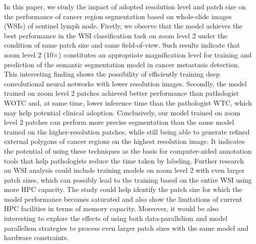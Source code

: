 In this paper, we study the impact of adopted resolution level and patch size on the performance of cancer region segmentation based on whole-slide images (WSIs) of sentinel lymph node. Firstly, we observe that the model achieves the best performance in the WSI classification task on zoom level 2 under the condition of same patch size and same field-of-view. Such results indicate that zoom level 2 (10$\times$) constitutes an appropriate magnification level for training and prediction of the semantic segmentation model in cancer metastasis detection. This interesting finding shows the possibility of efficiently training deep convolutional neural networks with lower resolution images. Secondly, the model trained on zoom level 2 patches achieved better performance than pathologist WOTC and, at same time, lower inference time than the pathologist WTC, which may help potential clinical adoption. Conclusively, our model trained on zoom level 2 patches can perform more precise segmentation than the same model trained on the higher-resolution patches, while still being able to generate refined external polygons of cancer regions on the highest resolution image. It indicates the potential of using these techniques as the basis for computer-aided annotation tools that help pathologists reduce the time taken by labeling. Further research on WSI analysis could include training models on zoom level 2 with even larger patch sizes, which can possibly lead to the training based on the entire WSI using more HPC capacity. The study could help identify the patch size for which the model performance becomes saturated and also show the limitations of current HPC facilities in terms of memory capacity. Moreover, it would be also interesting to explore the effects of using both data-parallelism and model parallelism strategies to process even larger patch sizes with the same model and hardware constraints.
